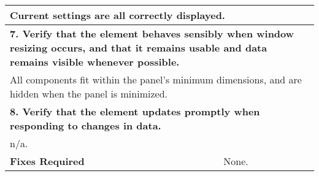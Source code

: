 \begin{longtable}{ l p{10cm} }
 \multicolumn{2}{p{14cm}}{Current settings are all correctly displayed.}\\
 \hline
 \multicolumn{2}{p{14cm}}{\textbf{7. Verify that the element behaves sensibly when window resizing occurs, and that it remains usable and data remains visible whenever possible.}}\\
 \multicolumn{2}{p{14cm}}{All components fit within the panel's minimum dimensions, and are hidden when the panel is minimized.}\\
 \hline
 \multicolumn{2}{p{14cm}}{\textbf{8. Verify that the element updates promptly when responding to changes in data.}}\\
 \multicolumn{2}{p{14cm}}{n/a.}\\
 \hline
 \textbf{Fixes Required} & None.\\
 \bottomrule
\end{longtable}
\clearpage

